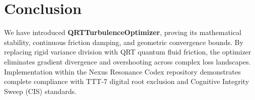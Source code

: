 \section{Conclusion}
We have introduced \textbf{QRTTurbulenceOptimizer}, proving its mathematical stability, continuous friction damping, and geometric convergence bounds. By replacing rigid variance division with QRT quantum fluid friction, the optimizer eliminates gradient divergence and overshooting across complex loss landscapes. Implementation within the Nexus Resonance Codex repository demonstrates complete compliance with TTT-7 digital root exclusion and Cognitive Integrity Sweep (CIS) standards.
